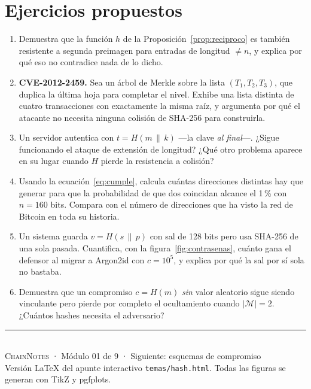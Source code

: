 \documentclass[11pt,a4paper]{article}
\theoremstyle{definition}
\theoremstyle{plain}
\theoremstyle{remark}
\newcommand{\concat}{\,\|\,}
\begin{document}
\section{Ejercicios propuestos}

\begin{enumerate}[leftmargin=2.4em,itemsep=0.5em]
  \item Demuestra que la función $h$ de la Proposición~\ref{prop:reciproco} es
    también resistente a segunda preimagen para entradas de longitud
    $\neq n$, y explica por qué eso no contradice nada de lo dicho.

  \item\label{ej:cve} \textbf{CVE-2012-2459.} Sea un árbol de Merkle sobre la
    lista $(T_1, T_2, T_3)$, que duplica la última hoja para completar el nivel.
    Exhibe una lista distinta de cuatro transacciones con exactamente la misma
    raíz, y argumenta por qué el atacante no necesita ninguna colisión de
    SHA-256 para construirla.

  \item Un servidor autentica con $t = H(m \concat k)$ ---la clave \emph{al
    final}---. ¿Sigue funcionando el ataque de extensión de longitud? ¿Qué otro
    problema aparece en su lugar cuando $H$ pierde la resistencia a colisión?

  \item Usando la ecuación~\eqref{eq:cumple}, calcula cuántas direcciones
    distintas hay que generar para que la probabilidad de que dos coincidan
    alcance el 1\,\% con $n = 160$ bits. Compara con el número de direcciones que
    ha visto la red de Bitcoin en toda su historia.

  \item Un sistema guarda $v = H(s \concat p)$ con sal de 128 bits pero usa
    SHA-256 de una sola pasada. Cuantifica, con la figura~\ref{fig:contrasenas},
    cuánto gana el defensor al migrar a Argon2id con $c = 10^{5}$, y explica por
    qué la sal por sí sola no bastaba.

  \item Demuestra que un compromiso $c = H(m)$ \emph{sin} valor aleatorio sigue
    siendo vinculante pero pierde por completo el ocultamiento cuando
    $|\mathcal{M}| = 2$. ¿Cuántos hashes necesita el adversario?
\end{enumerate}

\vfill
\begin{center}
\color{inkc}\small
\rule{0.35\textwidth}{0.4pt}\\[0.6em]
\textsc{ChainNotes} · Módulo 01 de 9 · Siguiente: esquemas de compromiso\\
{\footnotesize Versión LaTeX del apunte interactivo \texttt{temas/hash.html}.
Todas las figuras se generan con TikZ y pgfplots.}
\end{center}
\end{document}
